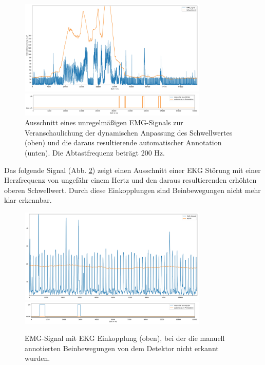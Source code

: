 \begin{figure}[!ht]%
	\begin{center}
	\includegraphics[width=0.80\textwidth]{./Bilder/vorrÃ¼bergehendesRauschenEMGacq_002963603.edf108000,72000.jpg}
	
	\includegraphics[width=0.80\textwidth]{./Bilder/vorrÃ¼bergehendesRauschenacq_002963603.edf108000,72000.jpg}
	\end{center}
	\caption{Ausschnitt eines unregelmäßigen EMG-Signals zur Veranschaulichung der dynamischen Anpassung des Schwellwertes (oben) und die daraus resultierende automatischer Annotation (unten). Die Abtastfrequenz beträgt 200 Hz.}%
	\label{fig:detectorWorking}%
\end{figure}


Das folgende Signal (Abb. \ref{fig:EKG}) zeigt einen Ausschnitt einer EKG Störung mit einer Herzfrequenz von ungefähr einem Hertz und den daraus resultierenden erhöhten oberen Schwellwert. Durch diese Einkopplungen sind Beinbewegungen nicht mehr klar erkennbar.

\begin{figure}[!ht]%
	\begin{center}
	\includegraphics[width=0.80\textwidth]{./Bilder/maybeNoiseNoIdeaWhatHappenedEMGacq_002963603.edf276000,12000.jpg}
	\includegraphics[width=0.80\textwidth]{./Bilder/maybeNoiseNoIdeaWhatHappenedacq_002963603.edf276000,12000.jpg}
	\end{center}
	\caption{EMG-Signal mit EKG Einkopplung (oben), bei der die manuell annotierten Beinbewegungen von dem Detektor nicht erkannt wurden.}%
	\label{fig:EKG}%
\end{figure}

